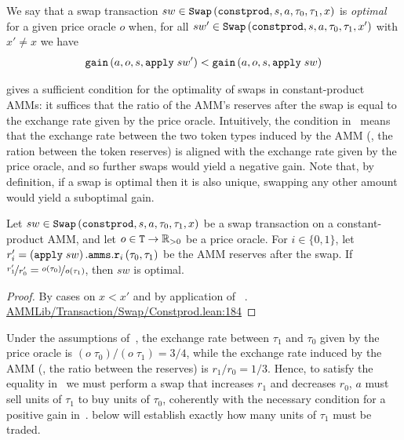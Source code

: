 We say that a swap transaction $sw \in \code{Swap}\left(\code{constprod},s,a,\tau_0,\tau_1,x\right)$ is \emph{optimal} for a given price oracle $o$ when, for all $sw' \in \code{Swap}\left(\code{constprod},s,a,\tau_0,\tau_1,x'\right)$ with $x' \neq x$ we have 
\[
\code{gain}\left(a, o, s, \code{apply}\; sw'\right) < \code{gain}\left(a, o, s, \code{apply}\; sw\right)
\]

 gives a sufficient condition for the optimality of swaps in constant-product AMMs: it suffices that the ratio of the AMM's reserves after the swap is equal to the exchange rate given by the price oracle.
Intuitively, the condition in~ means that the exchange rate between the two token types induced by the AMM (\ie, the ration between the token reserves) is aligned with the exchange rate given by the price oracle, and so further swaps would yield a negative gain.
Note that, by definition, if a swap is optimal then it is also unique, \ie swapping any other amount would yield a suboptimal gain.

\begin{theorem}
\label{th:suffopt}
Let $sw \in \code{Swap}\left(\code{constprod},s,a,\tau_0,\tau_1,x\right)$
be a swap transaction on a constant-product AMM, 
and let $o \in \code{T} \to \mathbb R_{>0}$ be a price oracle. 
For $i \in \{0,1\}$,
let $r_i' = \left(\code{apply}\; sw\right)\code{.amms.r}_i\left(\tau_0,\tau_1\right)$
be the AMM reserves after the swap.
If $\nicefrac{r_1'}{r_0'} = \nicefrac{o(\tau_0)}{o(\tau_1)}$, then $sw$ is optimal.
\end{theorem}
\begin{proof}
By cases on $x < x'$ and by application of ~. {\href{https://github.com/danielepusceddu/lean4-amm/blob/paper/AMMLib/Transaction/Swap/Constprod.lean#L184}{AMMLib/Transaction/Swap/Constprod.lean:184}}
\end{proof}

\begin{example} 
\label{ex:results:suffopt}
Under the assumptions of~, the exchange rate between $\tau_1$ and $\tau_0$ given by the price oracle is
$(o\;\tau_0)/(o\;\tau_1) = 3/4$, while the exchange rate induced by the AMM (\ie, the ratio between the reserves) is $r_1/r_0 = 1/3$.
Hence, to satisfy the equality in~ we must perform a swap that increases $r_1$ and decreases $r_0$, \ie $a$ must sell units of $\tau_1$ to buy units of $\tau_0$, coherently with the necessary condition for a positive gain in~. 
 below will establish exactly how many units of $\tau_1$ must be traded.
\end{example}

